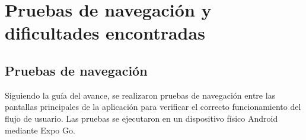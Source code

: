 
\section{Pruebas de navegaci\'on y dificultades encontradas}

\subsection{Pruebas de navegaci\'on}

Siguiendo la gu\'ia del avance, se realizaron pruebas de navegaci\'on entre
las pantallas principales de la aplicaci\'on para verificar el correcto
funcionamiento del flujo de usuario. Las pruebas se ejecutaron en un
dispositivo f\'isico Android mediante Expo Go.

